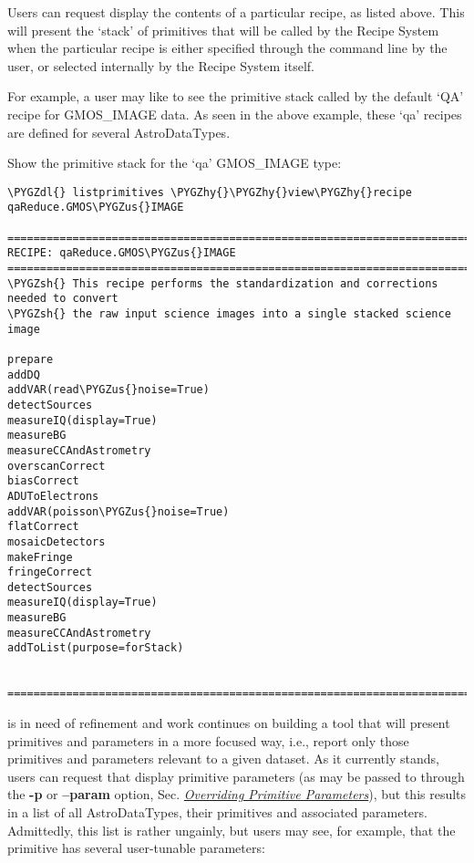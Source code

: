 \documentclass[letterpaper,10pt,english]{sphinxmanual}
\def\PYGZus{\char`\_}
\def\PYGZsh{\char`\#}
\def\PYGZdl{\char`\$}
\def\PYGZhy{\char`\-}
\begin{document}
Users can request display the contents of a particular recipe, as listed above.
This will present the `stack' of primitives that will be called by the
Recipe System when the particular recipe is either specified through the
 command line by the user, or selected internally by the Recipe System
itself.

For example, a user may like to see the primitive stack called by the default
`QA' recipe for GMOS\_IMAGE data. As seen in the above example, these `qa' recipes
are defined for several AstroDataTypes.

Show the primitive stack for the `qa' GMOS\_IMAGE type:

\begin{Verbatim}[commandchars=\\\{\}]
\PYGZdl{} listprimitives \PYGZhy{}\PYGZhy{}view\PYGZhy{}recipe qaReduce.GMOS\PYGZus{}IMAGE

===============================================================================
RECIPE: qaReduce.GMOS\PYGZus{}IMAGE
===============================================================================
\PYGZsh{} This recipe performs the standardization and corrections needed to convert
\PYGZsh{} the raw input science images into a single stacked science image

prepare
addDQ
addVAR(read\PYGZus{}noise=True)
detectSources
measureIQ(display=True)
measureBG
measureCCAndAstrometry
overscanCorrect
biasCorrect
ADUToElectrons
addVAR(poisson\PYGZus{}noise=True)
flatCorrect
mosaicDetectors
makeFringe
fringeCorrect
detectSources
measureIQ(display=True)
measureBG
measureCCAndAstrometry
addToList(purpose=forStack)


===============================================================================
\end{Verbatim}

 is in need of refinement and work continues on
building a tool that will present primitives and parameters in a more focused
way, i.e., report only those primitives and parameters relevant to a given
dataset. As it currently stands, users can request that 
display primitive parameters (as may be passed to  through the
\textbf{-p} or \textbf{--param} option, Sec. {\hyperref[interfaces:userpars]{\emph{Overriding Primitive Parameters}}}), but this results in a
list of all AstroDataTypes, their primitives and associated parameters.
Admittedly, this list is rather ungainly, but users may see, for example, that
the primitive  has several user-tunable parameters:
\end{document}
